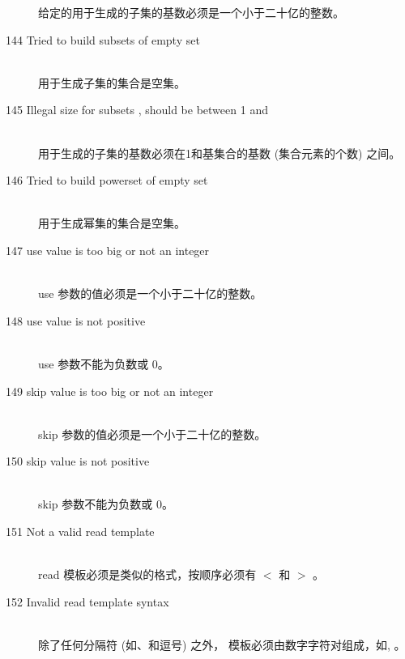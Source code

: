 \begin{description}
  给定的用于生成的子集的基数必须是一个小于二十亿的整数。
\item[144 Tried to build subsets of empty set]\ \\
  用于生成子集的集合是空集。
\item[145 Illegal size for subsets \code{xxx}, should be between 1 
  and \code{yyy}]\ \\
  用于生成的子集的基数必须在1和基集合的基数 (集合元素的个数) 之间。
\item[146 Tried to build powerset of empty set ]\ \\
  用于生成幂集的集合是空集。
%
%
\item[147 use value \code{xxx} is too big or not an integer]\ \\
  use 参数的值必须是一个小于二十亿的整数。
\item[148 use value \code{xxx} is not positive]\ \\
  use 参数不能为负数或 0。
\item[149 skip value \code{xxx} is too big or not an integer]\ \\
  skip 参数的值必须是一个小于二十亿的整数。
\item[150 skip value \code{xxx} is not positive]\ \\
  skip 参数不能为负数或 0。
\item[151 Not a valid read template]\ \\
  read 模板必须是类似的格式，按顺序必须有 $<$ 和 $>$ 。
\item[152 Invalid read template syntax]\ \\
  除了任何分隔符 (如\code{$<$}、\code{$>$}和逗号) 之外，
  模板必须由数字字符对组成，如, 。

\end{description}
